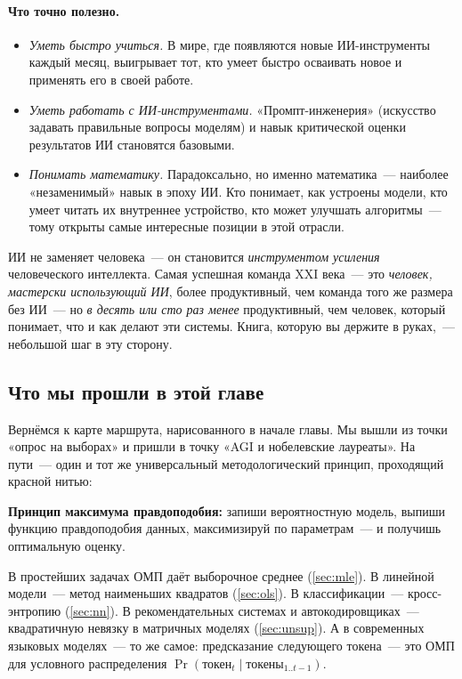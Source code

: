 \paragraph{Что точно полезно.}
\begin{itemize}\itemsep1pt
  \item \emph{Уметь быстро учиться.} В мире, где появляются новые
        ИИ-инструменты каждый месяц, выигрывает тот, кто умеет
        быстро осваивать новое и применять его в своей работе.
  \item \emph{Уметь работать с ИИ-инструментами.} «Промпт-инженерия»
        (искусство задавать правильные вопросы моделям) и навык
        критической оценки результатов ИИ становятся базовыми.
  \item \emph{Понимать математику.} Парадоксально, но именно
        математика~--- наиболее «незаменимый» навык в эпоху ИИ.
        Кто понимает, как устроены модели, кто умеет читать их
        внутреннее устройство, кто может улучшать алгоритмы~--- тому
        открыты самые интересные позиции в этой отрасли.
\end{itemize}

\begin{notebox}
ИИ не заменяет человека~--- он становится \emph{инструментом
усиления} человеческого интеллекта. Самая успешная команда XXI века~---
это \emph{человек, мастерски использующий ИИ}, более продуктивный,
чем команда того же размера без ИИ~--- но \emph{в десять или сто раз
менее} продуктивный, чем человек, который понимает, что и как делают
эти системы. Книга, которую вы держите в руках,~--- небольшой шаг в
эту сторону.
\end{notebox}

\subsection{Что мы прошли в этой главе}

Вернёмся к карте маршрута, нарисованного в начале главы. Мы вышли из
точки «опрос на выборах» и пришли в точку «AGI и нобелевские
лауреаты». На пути~--- один и тот же универсальный методологический
принцип, проходящий красной нитью:

\medskip
\noindent
\textbf{Принцип максимума правдоподобия:} запиши вероятностную
модель, выпиши функцию правдоподобия данных, максимизируй по
параметрам~--- и получишь оптимальную оценку.

\medskip

В простейших задачах ОМП даёт выборочное среднее (\cref{sec:mle}). В
линейной модели~--- метод наименьших квадратов (\cref{sec:ols}). В
классификации~--- кросс-энтропию (\cref{sec:nn}). В рекомендательных
системах и автокодировщиках~--- квадратичную невязку в
матричных моделях (\cref{sec:unsup}). А в современных языковых
моделях~--- то же самое: предсказание следующего токена~--- это ОМП
для условного распределения $\Pr(\text{токен}_t\mid\text{токены}_{1..t-1})$.

